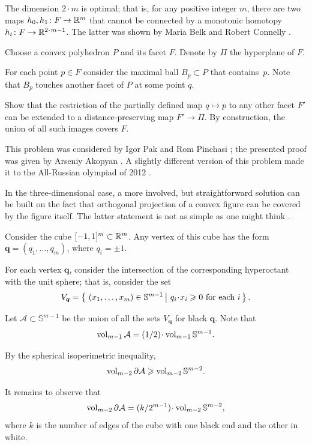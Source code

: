 The dimension $2\cdot m$ is optimal;
that is, for any positive integer $m$,
there are two maps $h_0,h_1\colon F\to \mathbb{R}^m$ that cannot be connected by a monotonic homotopy $h_t\:F\to\RR^{2\cdot m-1}$.
The latter was shown by Maria Belk and Robert Connelly \cite{belk-connelly}.

Choose a convex polyhedron $P$ and its facet $F$.
Denote by $\Pi$ the hyperplane of $F$.

For each point $p\in F$ consider the maximal ball $B_p\subset P$ that contains~$p$.
Note that $B_p$ touches another facet of $P$ at some point $q$.

Show that the restriction of the partially defined map $q\mapsto p$ to any other facet $F'$ can be extended to a distance-preserving map $F'\to \Pi$.
By construction, the union of all such images covers \(F\).
\qeds

This problem was considered by Igor Pak and Rom Pinchasi \cite{pak-pinchas};
the presented proof was given by Arseniy Akopyan \cite{akopyan-2012}.
A slightly different version of this problem made it to the All-Russian olympiad of 2012 \cite[№ 116774]{problems}.

In the three-dimensional case,
a more involved, but straightforward solution can be built on the fact that orthogonal projection of a convex figure can be covered by the figure itself.
The latter statement is not as simple as one might think  \cite[see][and the references therein]{kos-toroscik}.

Consider the cube $[-1,1]^m\subset \mathbb{R}^m$.
Any vertex of this cube has the form $\bm{q}=(q_1,\ldots,q_m)$,
where  $q_i=\pm1$.

For each vertex $\bm{q}$,
consider the intersection of the corresponding hyperoctant with the unit sphere;
that is, consider the set
\[V_{\bm{q}}=\set{(x_1,\ldots,x_m)\in\mathbb{S}^{m-1}}{q_i\cdot x_i\ge 0\ \text{for each}\ i}.\]

Let $\mathcal{A}\subset\mathbb{S}^{m-1}$ be the union of all the sets $V_{\bm{q}}$ for black $\bm{q}$.
Note that 
\[\vol_{m-1}\mathcal{A}=\tfrac12\cdot\vol_{m-1}\mathbb{S}^{m-1}.\]

By the spherical isoperimetric inequality,
\[\operatorname{\rm vol}\nolimits_{m-2}\partial\mathcal{A}
\geqslant \operatorname{\rm vol}\nolimits_{m-2}\mathbb{S}^{m-2}.\] 

It remains to observe that
\[\vol_{m-2}\partial\mathcal{A}
=
\tfrac k{2^{m-1}}\cdot\vol_{m-2}\mathbb{S}^{m-2},\]
where $k$ is the number of edges of the cube with one black end and the other in white.
\qeds

